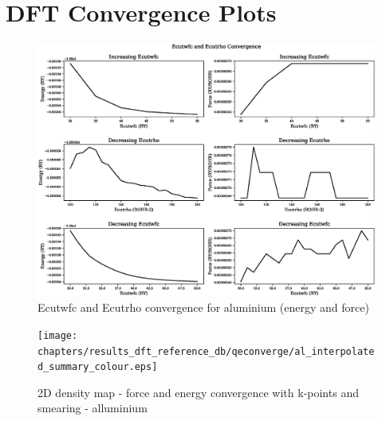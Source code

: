 \chapter{DFT Convergence Plots}
\label{section:dftconvplots}

\clearpage

\begin{landscape}
\FloatBarrier
\begin{figure}
    \begin{center}
        \includegraphics[scale=0.70]{chapters/results_dft_reference_db/qeconverge/al_ecut_convergence_ry.eps}
        \caption{Ecutwfc and Ecutrho convergence for aluminium (energy and force)}
      \label{image:aluminiumecut}
    \end{center}
\end{figure}
\FloatBarrier
\end{landscape}

\clearpage

\begin{landscape}
\FloatBarrier
\begin{figure}
    \begin{center}
        \texttt{[image: chapters/results\_dft\_reference\_db/qeconverge/al\_interpolated\_summary\_colour.eps]}
        \caption{2D density map - force and energy convergence with k-points and smearing - alluminium}
      \label{image:aluminiumkpointsmearing}
    \end{center}
\end{figure}
\FloatBarrier
\end{landscape}

\clearpage

